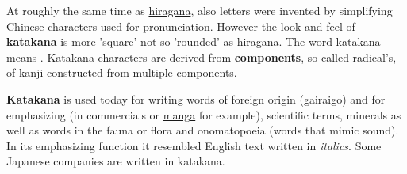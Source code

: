 

At roughly the same time as \hyperref[sec:Hiragana]{hiragana}, also
 letters were invented by
simplifying Chinese characters used for pronunciation. However the look and
feel of \textbf{katakana} is more 'square' not so 'rounded' as hiragana.  The
word katakana  means .
Katakana characters are derived from \textbf{components}, so called radical's,
of kanji constructed from multiple components.

\textbf{Katakana} is used today for writing words of foreign origin (gairaigo)
and for emphasizing (in commercials or \hyperref[sec:Manga]{manga} for
example), scientific terms, minerals as well as words in the fauna or flora and
onomatopoeia (words that mimic sound). In its emphasizing function it resembled
English text written in \textit{italics}. Some Japanese companies are written
in katakana.


